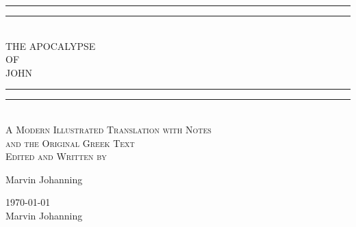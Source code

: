 \begin{doubletitle}
    \textheight
    \centering
    \vspace*{\baselineskip}
    \rule{\textwidth}{1.6pt}\vspace*{-\baselineskip}\vspace*{2pt}
    \rule{\textwidth}{0.4pt}\\[\baselineskip]
    {\LARGE THE APOCALYPSE \\ OF \\[0.3\baselineskip] JOHN }\\[0.2\baselineskip]
    \rule{\textwidth}{0.4pt}\vspace*{-\baselineskip}\vspace{3.2pt}
    \rule{\textwidth}{1.6pt}\\[\baselineskip]
    \scshape
    A Modern Illustrated Translation with Notes \\
    and the Original Greek Text \\
    \vspace*{2\baselineskip}
    Edited and Written by \\[\baselineskip]
    {\Large Marvin Johanning\par}
    \vfill
    {\scshape \monthyeardate\today} \\
    {\large Marvin Johanning}\par
\end{doubletitle}
